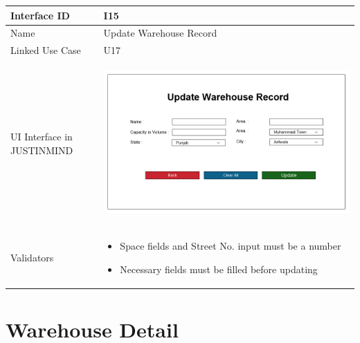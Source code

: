 \documentclass[12pt,a4paper]{report}
\begin{document}
\begin{tabular}{ | m{3cm} | m{12cm}| } \hline

Interface ID & I15  \\\hline

Name  &  Update Warehouse Record \\ \hline

Linked Use Case & U17 \\ \hline

UI Interface in JUSTINMIND & \begin{center} \includegraphics[scale=0.3]{./User Interface/UI-014 EditWarehouse@1x.png}\end{center}  \\ \hline

Validators & 
\begin{itemize}
\item   Space fields and Street No. input must be a number
\item  Necessary fields must be filled before updating


\end{itemize}
\\ \hline

\end{tabular} 
\section{Warehouse Detail }
\end{document}
